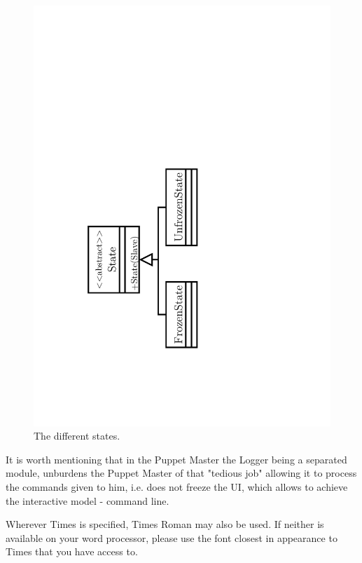 \documentclass[times, 10pt,twocolumn]{article}
\begin{document}
\begin{figure}[h]
\centering
	\includegraphics[scale=0.45]{"Architecture/State"}
    \caption{The different states.} 
    \label{fig:state}
\end{figure}


It is worth mentioning that in the Puppet Master the Logger being a separated module, unburdens the Puppet Master of that "tedious job" allowing it to process the commands given to him, i.e. does not freeze the UI, which allows to achieve the interactive model - command line.





Wherever Times is specified, Times Roman may also be used. If neither is 
available on your word processor, please use the font closest in 
appearance to Times that you have access to.
\end{document}
